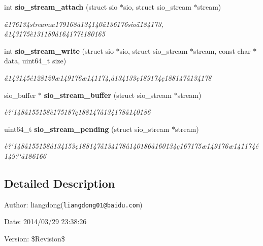 \begin{CompactItemize}
int {\bf sio\_\-stream\_\-attach} (struct sio $\ast$sio, struct sio\_\-stream $\ast$stream)
\begin{CompactList}\small\item\em \aa{}176134stream\ae{}179168\aa{}134140\aa{}136176sio\"{a}184173, \aa{}143175\`{e}131189\aa{}164177\`{e}180165 \item\end{CompactList}\item 
int {\bf sio\_\-stream\_\-write} (struct sio $\ast$sio, struct sio\_\-stream $\ast$stream, const char $\ast$data, uint64\_\-t size)
\begin{CompactList}\small\item\em \aa{}143145\'{e}128129\ae{}149176\ae{}141174,\aa{}134133\c{c}189174\c{c}188147\aa{}134178 \item\end{CompactList}\item 
sio\_\-buffer $\ast$ {\bf sio\_\-stream\_\-buffer} (struct sio\_\-stream $\ast$stream)
\begin{CompactList}\small\item\em \`{e}?`148\aa{}155158\`{e}175187\c{c}188147\aa{}134178\aa{}140186 \item\end{CompactList}\item 
uint64\_\-t {\bf sio\_\-stream\_\-pending} (struct sio\_\-stream $\ast$stream)
\begin{CompactList}\small\item\em \`{e}?`148\aa{}155158\aa{}134153\c{c}188147\aa{}134178\aa{}140186\aa{}160134\c{c}167175\ae{}149176\ae{}141174\'{e}149?`\aa{}186166 \item\end{CompactList}\end{CompactItemize}


\subsection{Detailed Description}
\begin{Desc}
\item[Author:]liangdong({\tt liangdong01@baidu.com}) \end{Desc}
\begin{Desc}
\item[Date:]2014/03/29 23:38:26 \end{Desc}
\begin{Desc}
\item[Version:]\$Revision\$ \end{Desc}


